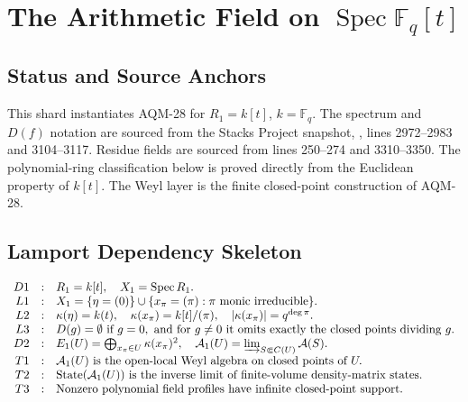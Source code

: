 
\section{The Arithmetic Field on \texorpdfstring{\(\operatorname{Spec}\mathbb F_q[t]\)}{Spec Fq[t]}}
\label{sec:spec-fq-t-arithmetic-field}

\subsection{Status and Source Anchors}

This shard instantiates AQM-28 for \(R_1=k[t]\), \(k=\mathbb F_q\).  The
spectrum and \(D(f)\) notation are sourced from the Stacks Project snapshot,
, lines
2972--2983 and 3104--3117.  Residue fields are sourced from lines 250--274
and 3310--3350.  The polynomial-ring classification below is proved directly
from the Euclidean property of \(k[t]\).  The Weyl layer is the finite
closed-point construction of AQM-28.

\subsection{Lamport Dependency Skeleton}

\[
\begin{array}{rcl}
D1&:&R_1=k[t],\quad X_1=\operatorname{Spec} R_1.\\
L1&:&X_1=\{\eta=(0)\}\cup\{x_\pi=(\pi):\pi
      \text{ monic irreducible}\}.\\
L2&:&\kappa(\eta)=k(t),\quad
      \kappa(x_\pi)=k[t]/(\pi),\quad
      |\kappa(x_\pi)|=q^{\deg\pi}.\\
L3&:&D(g)=\emptyset\text{ if }g=0,\text{ and for }g\ne0
      \text{ it omits exactly the closed points dividing }g.\\
D2&:&E_1(U)=\bigoplus_{x_\pi\in U}\kappa(x_\pi)^2,\quad
      \mathcal A_1(U)=\varinjlim_{S\Subset C(U)}\mathcal A(S).\\
T1&:&\mathcal A_1(U)\text{ is the open-local Weyl algebra on closed
      points of }U.\\
T2&:&\operatorname{State}(\mathcal A_1(U))\text{ is the inverse limit of
      finite-volume density-matrix states.}\\
T3&:&\text{Nonzero polynomial field profiles have infinite closed-point
      support.}
\end{array}
\]

